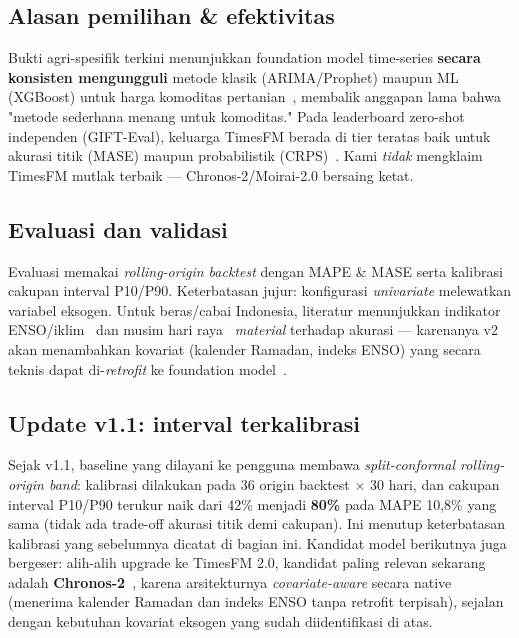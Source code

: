 \documentclass[11pt,a4paper]{article}
\begin{document}
\subsection{Alasan pemilihan \& efektivitas}
Bukti agri-spesifik terkini menunjukkan foundation model time-series \textbf{secara konsisten
mengungguli} metode klasik (ARIMA/Prophet) maupun ML (XGBoost) untuk harga komoditas
pertanian~\cite{wangzhang2026}, membalik anggapan lama bahwa "metode sederhana menang untuk
komoditas." Pada leaderboard zero-shot independen (GIFT-Eval), keluarga TimesFM berada di tier
teratas baik untuk akurasi titik (MASE) maupun probabilistik (CRPS)~\cite{timesfm2023}. Kami
\emph{tidak} mengklaim TimesFM mutlak terbaik --- Chronos-2/Moirai-2.0 bersaing ketat.

\subsection{Evaluasi dan validasi}
Evaluasi memakai \emph{rolling-origin backtest} dengan MAPE \& MASE serta kalibrasi cakupan
interval P10/P90. Keterbatasan jujur: konfigurasi \emph{univariate} melewatkan variabel eksogen.
Untuk beras/cabai Indonesia, literatur menunjukkan indikator ENSO/iklim~\cite{alanshari2025} dan
musim hari raya~\cite{eidpihps2026} \emph{material} terhadap akurasi --- karenanya v2 akan
menambahkan kovariat (kalender Ramadan, indeks ENSO) yang secara teknis dapat di-\emph{retrofit}
ke foundation model~\cite{chronosx2025}.

\subsection{Update v1.1: interval terkalibrasi}
Sejak v1.1, baseline yang dilayani ke pengguna membawa \emph{split-conformal rolling-origin
band}: kalibrasi dilakukan pada 36 origin backtest $\times$ 30 hari, dan cakupan interval P10/P90
terukur naik dari 42\% menjadi \textbf{80\%} pada MAPE 10,8\% yang sama (tidak ada trade-off
akurasi titik demi cakupan). Ini menutup keterbatasan kalibrasi yang sebelumnya dicatat di bagian
ini. Kandidat model berikutnya juga bergeser: alih-alih upgrade ke TimesFM 2.0, kandidat paling
relevan sekarang adalah \textbf{Chronos-2}~\cite{chronosx2025}, karena arsitekturnya
\emph{covariate-aware} secara native (menerima kalender Ramadan dan indeks ENSO tanpa retrofit
terpisah), sejalan dengan kebutuhan kovariat eksogen yang sudah diidentifikasi di atas.

\end{document}
